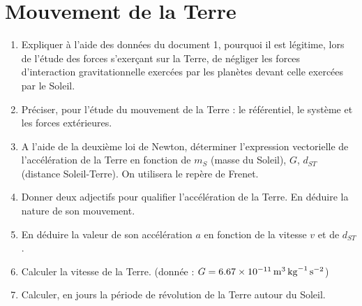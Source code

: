 \documentclass[a4paper,11pt,fleqn]{article}%
\begin{document}
\maketitle

\section{Mouvement de la Terre}
\begin{enumerate}
    \item Expliquer à l'aide des données du document 1, pourquoi il est légitime, lors de l'étude des forces s'exerçant sur la Terre, de négliger les forces d'interaction gravitationnelle exercées par les planètes devant celle exercées par le Soleil.
    \item Préciser, pour l'étude du mouvement de la Terre : le référentiel, le système et les forces extérieures.
    \item A l'aide de la deuxième loi de Newton, déterminer l'expression vectorielle de l'accélération de la Terre en fonction de $m_S$ (masse du Soleil), $G$, $d_{ST}$ (distance Soleil-Terre). On utilisera le repère de Frenet.
    \item Donner deux adjectifs pour qualifier l'accélération de la Terre. En déduire la nature de son mouvement.
    \item En déduire la valeur de son accélération $a$ en fonction de la vitesse $v$ et de $d_{ST}$.
    \item Calculer la vitesse de la Terre. (donnée : $G=\SI{6,67E-11}{\meter\cubed\per\kilo\gram\per\second\squared}$)
    \item Calculer, en jours la période de révolution de la Terre autour du Soleil.
\end{enumerate}
\end{document}
